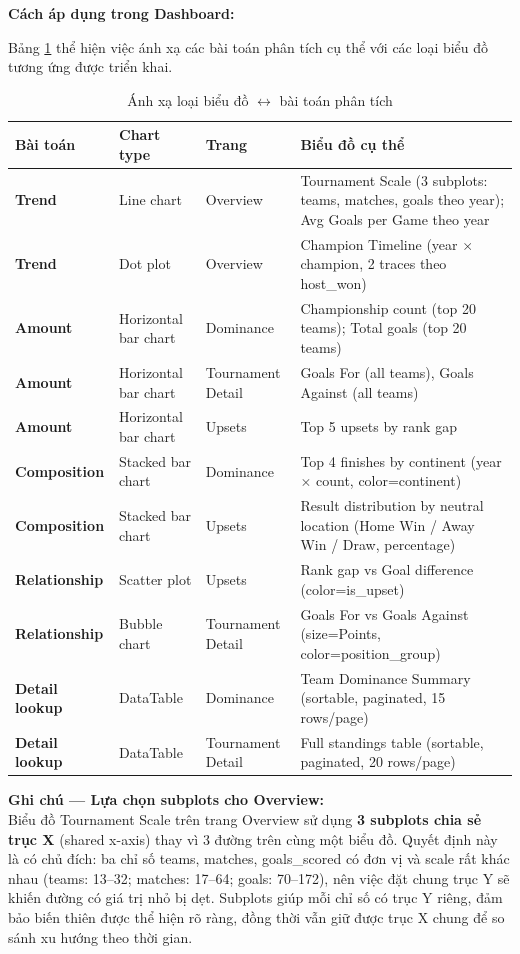 \documentclass[12pt,a4paper]{article}
\begin{document}
\textbf{Cách áp dụng trong Dashboard:}

Bảng \ref{tab:chart_mapping} thể hiện việc ánh xạ các bài toán phân tích cụ thể với các loại biểu đồ tương ứng được triển khai.

\begin{table}[H]
\centering
\caption{Ánh xạ loại biểu đồ $\leftrightarrow$ bài toán phân tích}
\label{tab:chart_mapping}
\begin{tabular}{lllp{6cm}}
\toprule
\textbf{Bài toán} & \textbf{Chart type} & \textbf{Trang} & \textbf{Biểu đồ cụ thể} \\
\midrule
\textbf{Trend} & Line chart & Overview & Tournament Scale (3 subplots: teams, matches, goals theo year); Avg Goals per Game theo year \\
\textbf{Trend} & Dot plot & Overview & Champion Timeline (year $\times$ champion, 2 traces theo host\_won) \\
\textbf{Amount} & Horizontal bar chart & Dominance & Championship count (top 20 teams); Total goals (top 20 teams) \\
\textbf{Amount} & Horizontal bar chart & Tournament Detail & Goals For (all teams), Goals Against (all teams) \\
\textbf{Amount} & Horizontal bar chart & Upsets & Top 5 upsets by rank gap \\
\textbf{Composition} & Stacked bar chart & Dominance & Top 4 finishes by continent (year $\times$ count, color=continent) \\
\textbf{Composition} & Stacked bar chart & Upsets & Result distribution by neutral location (Home Win / Away Win / Draw, percentage) \\
\textbf{Relationship} & Scatter plot & Upsets & Rank gap vs Goal difference (color=is\_upset) \\
\textbf{Relationship} & Bubble chart & Tournament Detail & Goals For vs Goals Against (size=Points, color=position\_group) \\
\textbf{Detail lookup} & DataTable & Dominance & Team Dominance Summary (sortable, paginated, 15 rows/page) \\
\textbf{Detail lookup} & DataTable & Tournament Detail & Full standings table (sortable, paginated, 20 rows/page) \\
\bottomrule
\end{tabular}
\end{table}

\textbf{Ghi chú --- Lựa chọn subplots cho Overview:} \\
Biểu đồ Tournament Scale trên trang Overview sử dụng \textbf{3 subplots chia sẻ trục X} (shared x-axis) thay vì 3 đường trên cùng một biểu đồ. Quyết định này là có chủ đích: ba chỉ số teams, matches, goals\_scored có đơn vị và scale rất khác nhau (teams: 13--32; matches: 17--64; goals: 70--172), nên việc đặt chung trục Y sẽ khiến đường có giá trị nhỏ bị dẹt. Subplots giúp mỗi chỉ số có trục Y riêng, đảm bảo biến thiên được thể hiện rõ ràng, đồng thời vẫn giữ được trục X chung để so sánh xu hướng theo thời gian.
\end{document}
